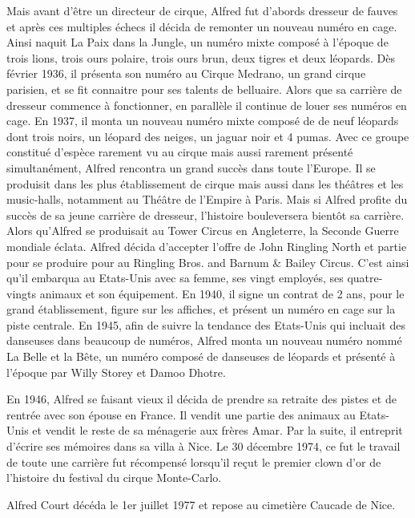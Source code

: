 Mais avant d’être un directeur de cirque, Alfred fut d’abords dresseur de fauves et après ces multiples échecs il décida de remonter un nouveau numéro en cage. Ainsi naquit La Paix dans la Jungle, un numéro mixte composé à l’époque de trois lions, trois ours polaire, trois ours brun, deux tigres et deux léopards. Dès février 1936, il présenta son numéro au Cirque Medrano, un grand cirque parisien, et se fit connaitre pour ses talents de belluaire. Alors que sa carrière de dresseur commence à fonctionner, en parallèle il continue de louer ses numéros en cage. En 1937, il monta un nouveau numéro mixte composé de de neuf léopards dont trois noirs, un léopard des neiges, un jaguar noir et 4 pumas. Avec ce groupe constitué d’espèce rarement vu au cirque mais aussi rarement présenté simultanément, Alfred rencontra un grand succès dans toute l’Europe. Il se produisit dans les plus établissement de cirque mais aussi dans les théâtres et les music-halls, notamment au Théâtre de l’Empire à Paris. Mais si Alfred profite du succès de sa jeune carrière de dresseur, l’histoire bouleversera bientôt sa carrière.
Alors qu’Alfred se produisait au Tower Circus en Angleterre, la Seconde Guerre mondiale éclata. Alfred décida d’accepter l’offre de John Ringling North et partie pour se produire pour au Ringling Bros. and Barnum \& Bailey Circus. C’est ainsi qu’il embarqua au Etats-Unis avec sa femme, ses vingt employés, ses quatre-vingts animaux et son équipement. En 1940, il signe un contrat de 2 ans, pour le grand établissement, figure sur les affiches, et présent un numéro en cage sur la piste centrale. En 1945, afin de suivre la tendance des Etats-Unis qui incluait des danseuses dans beaucoup de numéros, Alfred monta un nouveau numéro nommé La Belle et la Bête, un numéro composé de danseuses de léopards et présenté à l’époque par Willy Storey et Damoo Dhotre. 

En 1946, Alfred se faisant vieux il décida de prendre sa retraite des pistes et de rentrée avec son épouse en France. Il vendit une partie des animaux au Etats-Unis et vendit le reste de sa ménagerie aux frères Amar. Par la suite, il entreprit d’écrire ses mémoires dans sa villa à Nice. Le 30 décembre 1974, ce fut le travail de toute une carrière fut récompensé lorsqu’il reçut le premier clown d’or de l’histoire du festival du cirque Monte-Carlo. 

Alfred Court décéda le 1er juillet 1977 et repose au cimetière Caucade de Nice. 





\thispagestyle{empty} %

